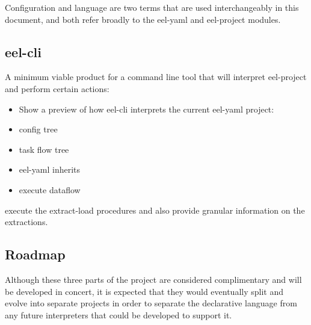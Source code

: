 Configuration and language are two terms that are used interchangeably
in this document, and both refer broadly to the eel-yaml and eel-project
modules.

\subsection{eel-cli}\label{eel-cli}

A minimum viable product for a command line tool that will interpret
eel-project and perform certain actions:

\begin{itemize}
\item
  Show a preview of how eel-cli interprets the current eel-yaml project:
\item
  config tree
\item
  task flow tree
\item
  eel-yaml inherits
\item
  execute dataflow
\end{itemize}

execute the extract-load procedures and also provide granular
information on the extractions.

\subsection{Roadmap}\label{roadmap}

Although these three parts of the project are considered complimentary
and will be developed in concert, it is expected that they would
eventually split and evolve into separate projects in order to separate
the declarative language from any future interpreters that could be
developed to support it.
